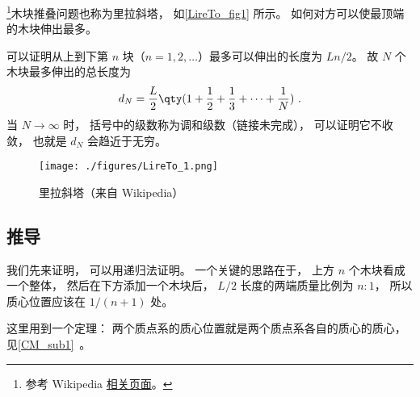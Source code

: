 
\begin{issues}
\issueDraft
\end{issues}


\footnote{参考 Wikipedia \href{https://en.wikipedia.org/wiki/Block-stacking_problem}{相关页面}。}木块推叠问题也称为里拉斜塔， 如\autoref{LireTo_fig1} 所示。 如何对方可以使最顶端的木块伸出最多。

可以证明从上到下第 $n$ 块（$n=1,2,\dots$）最多可以伸出的长度为 $Ln/2$。 故 $N$ 个木块最多伸出的总长度为
\begin{equation}
d_N = \frac{L}{2}\qty(1 + \frac{1}{2} + \frac{1}{3} + \dots + \frac{1}{N})~.
\end{equation}
当 $N\to\infty$ 时， 括号中的级数称为调和级数（链接未完成）， 可以证明它不收敛， 也就是 $d_N$ 会趋近于无穷。

\begin{figure}[ht]
\centering
\texttt{[image: ./figures/LireTo\_1.png]}
\caption{里拉斜塔（来自 Wikipedia）} \label{LireTo_fig1}
\end{figure}

\subsection{推导}
我们先来证明，   可以用递归法证明。  一个关键的思路在于， 上方 $n$ 个木块看成一个整体， 然后在下方添加一个木块后， $L/2$ 长度的两端质量比例为 $n:1$， 所以质心位置应该在 $1/(n+1)$ 处。

这里用到一个定理： 两个质点系的质心位置就是两个质点系各自的质心的质心， 见\autoref{CM_sub1}~。


